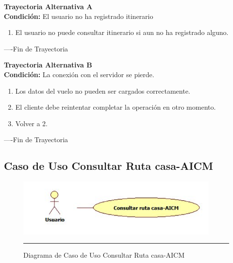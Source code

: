 \begin{flushleft}
	\hypertarget{TrayectoriaA_CU-U-06}{}
	\textbf{Trayectoria Alternativa A}\\
	\textbf{Condición:} El usuario no ha registrado itinerario\\
	\begin{enumerate}
		\item El usuario no puede consultar itinerario si aun no ha registrado alguno.
	\end{enumerate}
\end{flushleft}
----Fin de Trayectoria

\begin{flushleft}
	\hypertarget{TrayectoriaB_CU-U-06}{}
	\textbf{Trayectoria Alternativa B}\\
	\textbf{Condición:} La conexión con el servidor se pierde. \\
	\begin{enumerate}
		\item Los datos del vuelo no pueden ser cargados correctamente. 
		\item El cliente debe reintentar completar la operación en otro momento. 
		\item Volver a 2. 
	\end{enumerate}
\end{flushleft}
----Fin de Trayectoria
\clearpage

\subsection{Caso de Uso Consultar Ruta casa-AICM}

\begin{figure}[htbp]
	\centering
		\includegraphics[width=0.9\textwidth]{Figuras/cuConsultarRutacasa-AICM.png}
		\rule{30em}{0.5pt}
	\caption[Diagrama de Caso de Uso Consultar Ruta casa-AICM]{Diagrama de Caso de Uso Consultar Ruta casa-AICM}
	\label{fig:cuConsultarRutacasa-AICM}
\end{figure}

